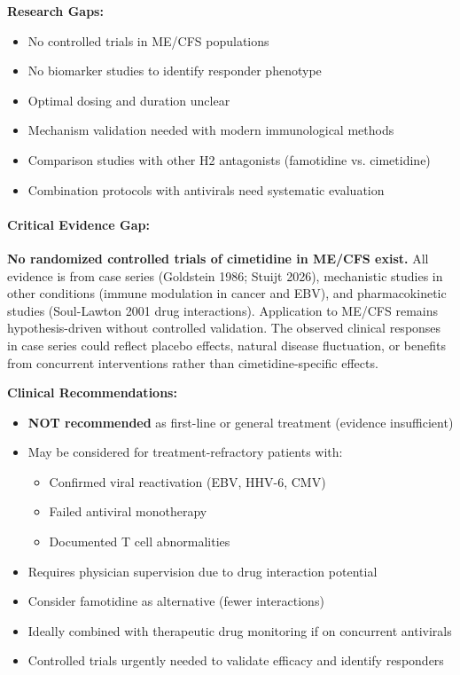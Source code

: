 \textbf{Research Gaps:}
\begin{itemize}
    \item No controlled trials in ME/CFS populations
    \item No biomarker studies to identify responder phenotype
    \item Optimal dosing and duration unclear
    \item Mechanism validation needed with modern immunological methods
    \item Comparison studies with other H2 antagonists (famotidine vs. cimetidine)
    \item Combination protocols with antivirals need systematic evaluation
\end{itemize}

\paragraph{Critical Evidence Gap:}

\textbf{No randomized controlled trials of cimetidine in ME/CFS exist.} All evidence is from case series (Goldstein 1986; Stuijt 2026), mechanistic studies in other conditions (immune modulation in cancer and EBV), and pharmacokinetic studies (Soul-Lawton 2001 drug interactions). Application to ME/CFS remains hypothesis-driven without controlled validation. The observed clinical responses in case series could reflect placebo effects, natural disease fluctuation, or benefits from concurrent interventions rather than cimetidine-specific effects.

\textbf{Clinical Recommendations:}
\begin{itemize}
    \item \textbf{NOT recommended} as first-line or general treatment (evidence insufficient)
    \item May be considered for treatment-refractory patients with:
          \begin{itemize}
              \item Confirmed viral reactivation (EBV, HHV-6, CMV)
              \item Failed antiviral monotherapy
              \item Documented T cell abnormalities
          \end{itemize}
    \item Requires physician supervision due to drug interaction potential
    \item Consider famotidine as alternative (fewer interactions)
    \item Ideally combined with therapeutic drug monitoring if on concurrent antivirals
    \item Controlled trials urgently needed to validate efficacy and identify responders
\end{itemize}

